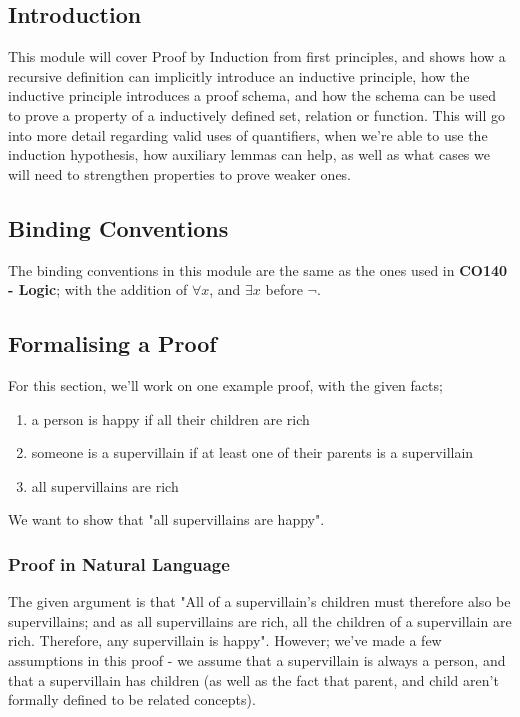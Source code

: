 \documentclass[a4paper, 12pt]{article}
\begin{document}
        \subsection*{Introduction}
            This module will cover Proof by Induction from first principles, and shows how a recursive definition can implicitly introduce an inductive principle, how the inductive principle introduces a proof schema, and how the schema can be used to prove a property of a inductively defined set, relation or function. This will go into more detail regarding valid uses of quantifiers, when we're able to use the induction hypothesis, how auxiliary lemmas can help, as well as what cases we will need to strengthen properties to prove weaker ones.
        \subsection*{Binding Conventions}
            The binding conventions in this module are the same as the ones used in \textbf{CO140 - Logic}; with the addition of $\forall x$, and $\exists x$ before $\neg$.
        \subsection*{Formalising a Proof}
            For this section, we'll work on one example proof, with the given facts;
            \begin{enumerate}[(1)]
                \itemsep0em
                \item a person is happy if all their children are rich
                \item someone is a supervillain if at least one of their parents is a supervillain
                \item all supervillains are rich
            \end{enumerate}
            We want to show that "all supervillains are happy".
            \subsubsection*{Proof in Natural Language}
                The given argument is that "All of a supervillain's children must therefore also be supervillains; and as all supervillains are rich, all the children of a supervillain are rich. Therefore, any supervillain is happy". However; we've made a few assumptions in this proof - we assume that a supervillain is always a person, and that a supervillain has children (as well as the fact that parent, and child aren't formally defined to be related concepts).
                \medskip
\end{document}
